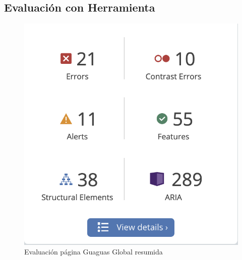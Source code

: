 \documentclass{article}
\begin{document}
        \subsection{Evaluación con Herramienta}
        \begin{figure}
            \centerline{\includegraphics[scale=0.3]{guaguasglobalsum}}
            \caption{Evaluación página Guaguas Global resumida}
            \label{fig:testsum}
        \end{figure}
\end{document}
